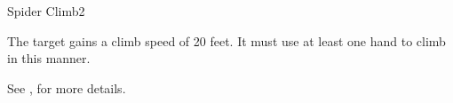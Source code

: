 \begin{spellsection}{Spider Climb}{2}
\begin{spellheader}
    \begin{spelltargetinginfo}
    \end{spelltargetinginfo}
\end{spellheader}
\begin{spellcontent}
    \begin{spelleffects}
        \spelleffect The target gains a climb speed of 20 feet. It must use at least one hand to climb in this manner.
        \spelldur \durmed
    \end{spelleffects}
\end{spellcontent}
\begin{spellfooter}
    \spellnotes See , for more details.
\end{spellfooter}%
\end{spellsection}

